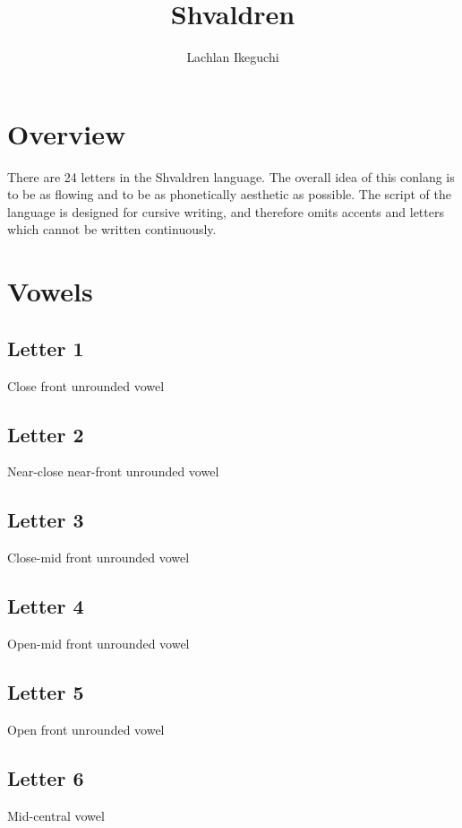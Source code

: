 \documentclass{book}
\title{Shvaldren}
\author{Lachlan Ikeguchi}
\newcommand{\display}[1]{\begin{center}\resizebox{2cm}{!}{\texttt{[image: \#1]}}\end{center}}
\begin{document}
\maketitle
\tableofcontents

\chapter{Overview}
There are 24 letters in the Shvaldren language.  The overall idea of this conlang is to be as flowing and to be as phonetically aesthetic as possible.  The script of the language is designed for cursive writing, and therefore omits accents and letters which cannot be written continuously.


\chapter{Vowels}
\section{Letter 1}
Close front unrounded vowel

\display{letters/vowels/1.JPG}


\section{Letter 2}
Near-close near-front unrounded vowel

\display{letters/vowels/2.JPG}


\section{Letter 3}
Close-mid front unrounded vowel

\display{letters/vowels/3.JPG}


\section{Letter 4}
Open-mid front unrounded vowel

\display{letters/vowels/4.JPG}


\section{Letter 5}
Open front unrounded vowel

\display{letters/vowels/5.JPG}


\section{Letter 6}
Mid-central vowel
\end{document}
